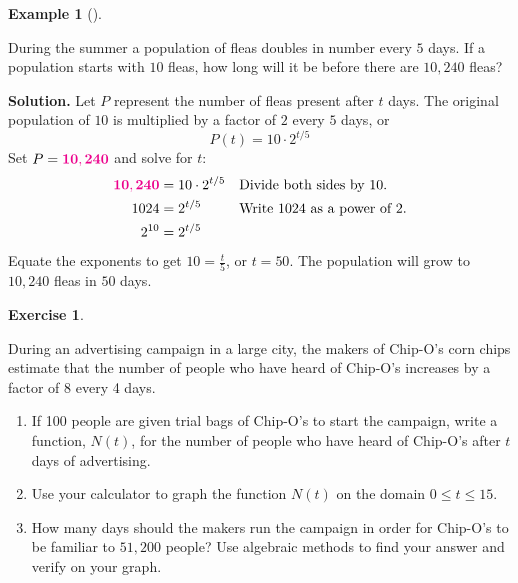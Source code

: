 \documentclass[10pt,]{book}
\theoremstyle{plain}
\theoremstyle{definition}
\theoremstyle{definition}
\theoremstyle{definition}
\newtheorem{example}[theorem]{Example}
\theoremstyle{definition}
\theoremstyle{definition}
\newtheorem{exercise}[theorem]{Exercise}
\numberwithin{equation}{section}
\newcommand{\alert}[1]{\mathbf{\color{magenta}{#1}}}
\newcommand{\amp}{ & }
\begin{document}
\begin{example}[]\label{example-flea-population}

		During the summer a population of fleas doubles in number every \(5\) days. If a population starts with \(10\) fleas, how long will it be before there are \(10,240\) fleas?
\par\medskip\noindent%
\textbf{Solution.}\quad 
	Let \(P\) represent the number of fleas present after \(t\) days. The original population of \(10\) is multiplied by a factor of \(2\) every \(5\) days, or
	\begin{equation*}P(t) = 10 \cdot 2^{t/5}\end{equation*}
	Set \(P = \alert{10,240}\) and solve for \(t\):
	\begin{align*}
	\alert{10,240} \amp = 10\cdot 2^{t/5}\amp\amp \text{Divide both sides by 10.} \\
	1024 \amp = 2^{t/5} \amp\amp \text {Write 1024 as a power of 2.} \\
	2^{10} \amp = 2^{t/5}
	\end{align*}
	Equate the exponents to get \(10 = \frac{t}{5}\), or \(t = 50\). The population will grow to \(10,240\) fleas in \(50\) days.
%
\end{example}
\begin{exercise}\label{exercise-ad-campaign}

	During an advertising campaign in a large city, the makers of Chip-O’s corn chips estimate that the number of people who have heard of Chip-O’s increases by a factor of \(8\) every 4 days.
	\leavevmode%
\begin{enumerate}[label=*\alph**]
\item\hypertarget{li-680}{}
			If 100 people are given trial bags of Chip-O's to start the campaign, write a function, \(N(t)\), for the number of people who have heard of Chip-O's after \(t\) days of advertising.
		\item\hypertarget{li-681}{}
			Use your calculator to graph the function \(N(t)\) on the domain \(0 \le t \le 15\).
		\item\hypertarget{li-682}{}
			How many days should the makers run the campaign in order for Chip-O's to be familiar to \(51,200\) people? Use algebraic methods to find your answer and verify on your graph.
		\end{enumerate}

%
\end{exercise}
\typeout{************************************************}
\typeout{************************************************}
\end{document}
